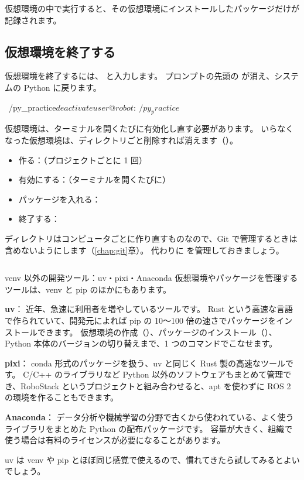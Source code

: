 仮想環境の中で実行すると、その仮想環境にインストールしたパッケージだけが記録されます。

\subsection{仮想環境を終了する}

仮想環境を終了するには、 と入力します。
プロンプトの先頭の  が消え、システムの Python に戻ります。

\begin{terminal}[仮想環境を終了する]
~/py_practice$ deactivate
user@robot:~/py_practice$
\end{terminal}

仮想環境は、ターミナルを開くたびに有効化し直す必要があります。
いらなくなった仮想環境は、ディレクトリごと削除すれば消えます（）。

\begin{point}[仮想環境の使い方のまとめ]
  \begin{itemize}
    \item 作る：（プロジェクトごとに 1 回）
    \item 有効にする：（ターミナルを開くたびに）
    \item パッケージを入れる：
    \item 終了する：
  \end{itemize}
   ディレクトリはコンピュータごとに作り直すものなので、Git で管理するときは含めないようにします（\ref{chap:git}章）。
  代わりに  を管理しておきましょう。
\end{point}

\begin{column}{venv 以外の開発ツール：uv・pixi・Anaconda}
  仮想環境やパッケージを管理するツールは、venv と pip のほかにもあります。

  \textbf{uv}：
  近年、急速に利用者を増やしているツールです。
  Rust という高速な言語で作られていて、開発元によれば pip の 10〜100 倍の速さでパッケージをインストールできます。
  仮想環境の作成（）、パッケージのインストール（）、Python 本体のバージョンの切り替えまで、1 つのコマンドでこなせます。

  \textbf{pixi}：
  conda 形式のパッケージを扱う、uv と同じく Rust 製の高速なツールです。
  C/C++ のライブラリなど Python 以外のソフトウェアもまとめて管理でき、RoboStack というプロジェクトと組み合わせると、apt を使わずに ROS 2 の環境を作ることもできます。

  \textbf{Anaconda}：
  データ分析や機械学習の分野で古くから使われている、よく使うライブラリをまとめた Python の配布パッケージです。
  容量が大きく、組織で使う場合は有料のライセンスが必要になることがあります。

  uv は venv や pip とほぼ同じ感覚で使えるので、慣れてきたら試してみるとよいでしょう。
\end{column}

